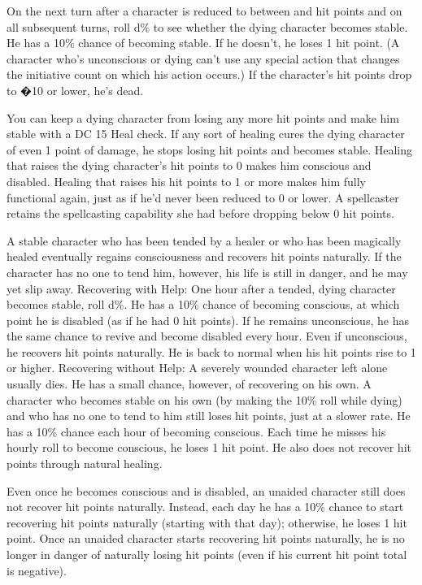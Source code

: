 On the next turn after a character is reduced to between  and  hit points and on all subsequent turns, roll d\% to see whether the dying character becomes stable. He has a 10\% chance of becoming stable. If he doesn't, he loses 1 hit point. (A character who's unconscious or dying can't use any special action that changes the initiative count on which his action occurs.) If the character's hit points drop to �10 or lower, he's dead.

You can keep a dying character from losing any more hit points and make him stable with a DC 15 Heal check.
If any sort of healing cures the dying character of even 1 point of damage, he stops losing hit points and becomes stable.
Healing that raises the dying character's hit points to 0 makes him conscious and disabled. Healing that raises his hit points to 1 or more makes him fully functional again, just as if he'd never been reduced to 0 or lower. A spellcaster retains the spellcasting capability she had before dropping below 0 hit points.

A stable character who has been tended by a healer or who has been magically healed eventually regains consciousness and recovers hit points naturally. If the character has no one to tend him, however, his life is still in danger, and he may yet slip away.
Recovering with Help: One hour after a tended, dying character becomes stable, roll d\%. He has a 10\% chance of becoming conscious, at which point he is disabled (as if he had 0 hit points). If he remains unconscious, he has the same chance to revive and become disabled every hour. Even if unconscious, he recovers hit points naturally. He is back to normal when his hit points rise to 1 or higher.
Recovering without Help: A severely wounded character left alone usually dies. He has a small chance, however, of recovering on his own. 
A character who becomes stable on his own (by making the 10\% roll while dying) and who has no one to tend to him still loses hit points, just at a slower rate. He has a 10\% chance each hour of becoming conscious. Each time he misses his hourly roll to become conscious, he loses 1 hit point. He also does not recover hit points through natural healing.

Even once he becomes conscious and is disabled, an unaided character still does not recover hit points naturally. Instead, each day he has a 10\% chance to start recovering hit points naturally (starting with that day); otherwise, he loses 1 hit point.
Once an unaided character starts recovering hit points naturally, he is no longer in danger of naturally losing hit points (even if his current hit point total is negative).

